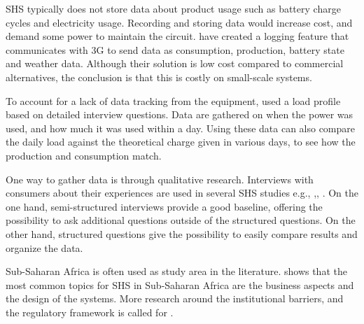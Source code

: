 SHS typically does not store data about product usage such as battery charge cycles and electricity usage. Recording and storing data would increase cost, and demand some power to maintain the circuit. \citep{lopez-vargasIoTApplicationRealTime2019} have created a logging feature that communicates with 3G to send data as consumption, production, battery state and weather data. Although their solution is low cost compared to commercial alternatives, the conclusion is that this is costly on small-scale systems.

To account for a lack of data tracking from the equipment, \citep{mannesEnduserEvaluationSolar2017} used a load profile based on detailed interview questions.  
Data are gathered on when the power was used, and how much it was used within a day. Using these data \citep{mannesEnduserEvaluationSolar2017} can also compare the daily load against the theoretical charge given in various days, to see how the production and consumption match.



One way to gather data is through qualitative research. Interviews with consumers about their experiences are used in several SHS studies e.g., \citep{mannesEnduserEvaluationSolar2017},\citep{asifGrameenShaktiExemplary2012}, \citep{beyeneSocioeconomicImpactsSolar2024}. On the one hand, semi-structured interviews provide a good baseline, offering the possibility to ask additional questions outside of the structured questions. On the other hand, structured questions give the possibility to easily compare results and organize the data.

Sub-Saharan Africa is often used as study area in the literature. \citep{kizilcecSolarHomeSystems2020} shows that the most common topics for SHS in Sub-Saharan Africa are the business aspects and the design of the systems. More research around the institutional barriers, and the regulatory framework is called for \citep{kizilcecSolarHomeSystems2020}.





